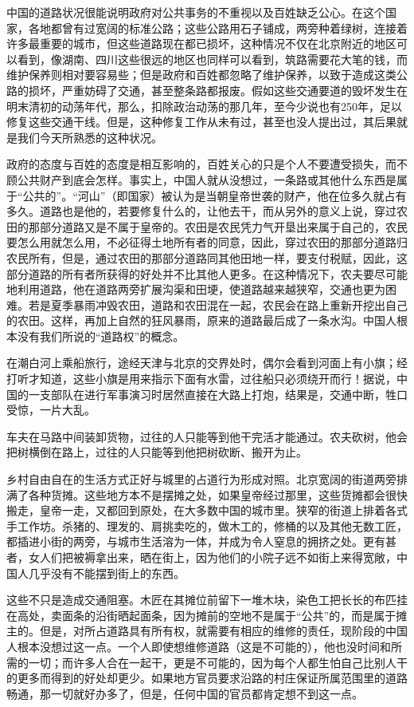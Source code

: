 \documentclass[12pt,oneside]{book}
\begin{document}
\begin{common-format}
中国的道路状况很能说明政府对公共事务的不重视以及百姓缺乏公心。在这个国家，各地都曾有过宽阔的标准公路；这些公路用石子铺成，两旁种着绿树，连接着许多最重要的城市，但这些道路现在都已损坏，这种情况不仅在北京附近的地区可以看到，像湖南、四川这些很远的地区也同样可以看到，筑路需要花大笔的钱，而维护保养则相对要容易些；但是政府和百姓都忽略了维护保养，以致于造成这类公路的损坏，严重妨碍了交通，甚至整条路都报废。假如这些交通要道的毁坏发生在明末清初的动荡年代，那么，扣除政治动荡的那几年，至今少说也有250年，足以修复这些交通干线。但是，这种修复工作从未有过，甚至也没人提出过，其后果就是我们今天所熟悉的这种状况。 

政府的态度与百姓的态度是相互影响的，百姓关心的只是个人不要遭受损失，而不顾公共财产到底会怎样。事实上，中国人就从没想过，一条路或其他什么东西是属于“公共的”。“河山”（即国家）被认为是当朝皇帝世袭的财产，他在位多久就占有多久。道路也是他的，若要修复什么的，让他去干，而从另外的意义上说，穿过农田的那部分道路又是不属于皇帝的。农田是农民凭力气开垦出来属于自己的，农民要怎么用就怎么用，不必征得土地所有者的同意，因此，穿过农田的那部分道路归农民所有，但是，通过农田的那部分道路同其他田地一样，要支付税赋，因此，这部分道路的所有者所获得的好处并不比其他人更多。在这种情况下，农夫要尽可能地利用道路，他在道路两旁扩展沟渠和田埂，使道路越来越狭窄，交通也更为困难。若是夏季暴雨冲毁农田，道路和农田混在一起，农民会在路上重新开挖出自己的农田。这样，再加上自然的狂风暴雨，原来的道路最后成了一条水沟。中国人根本没有我们所说的“道路权”的概念。 

在潮白河上乘船旅行，途经天津与北京的交界处时，偶尔会看到河面上有小旗；经打听才知道，这些小旗是用来指示下面有水雷，过往船只必须绕开而行！据说，中国的一支部队在进行军事演习时居然直接在大路上打炮，结果是，交通中断，牲口受惊，一片大乱。 

车夫在马路中间装卸货物，过往的人只能等到他干完活才能通过。农夫砍树，他会把树横倒在路上，过往的人只能等到他把树砍断、搬开为止。 

乡村自由自在的生活方式正好与城里的占道行为形成对照。北京宽阔的街道两旁排满了各种货摊。这些地方本不是摆摊之处，如果皇帝经过那里，这些货摊都会很快搬走，皇帝一走，又都回到原处，在大多数中国的城市里。狭窄的街道上排着各式手工作坊。杀猪的、理发的、肩挑卖吃的，做木工的，修桶的以及其他无数工匠，都插进小街的两旁，与城市生活溶为一体，并成为令人窒息的拥挤之处。更有甚者，女人们把被褥拿出来，晒在街上，因为他们的小院子远不如街上来得宽敞，中国人几乎没有不能摆到街上的东西。 

这些不只是造成交通阻塞。木匠在其摊位前留下一堆木块，染色工把长长的布匹挂在高处，卖面条的沿街晒起面条，因为摊前的空地不是属于“公共”的，而是属于摊主的。但是，对所占道路具有所有权，就需要有相应的维修的责任，现阶段的中国人根本没想过这一点。一个人即使想维修道路（这是不可能的），他也没时间和所需的一切；而许多人合在一起干，更是不可能的，因为每个人都生怕自己比别人干的更多而得到的好处却更少。如果地方官员要求沿路的村庄保证所属范围里的道路畅通，那一切就好办多了，但是，任何中国的官员都肯定想不到这一点。 


\end{common-format}
\end{document}

